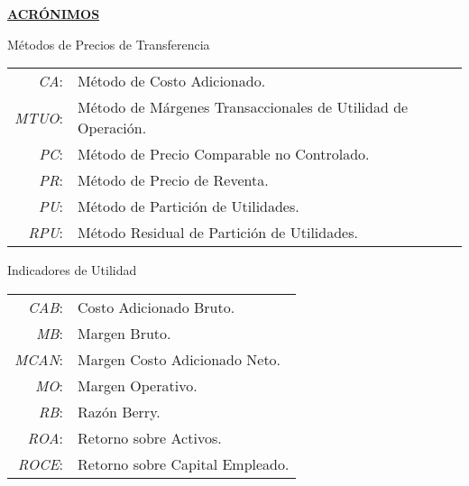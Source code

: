 \begin{center}
	\underline{\textbf{\textcolor{principal}{ACR\'ONIMOS}}}
\end{center}

\textcolor{principal}{Métodos de Precios de Transferencia}

\begin{table}[H]
 	\begin{tabular}{rp{10cm}}
\textit{CA}:&	Método de Costo Adicionado.\\
\textit{MTUO}:&	Método de Márgenes Transaccionales de Utilidad de Operación.\\
\textit{PC}:&	Método de Precio Comparable no Controlado.\\
\textit{PR}:&	Método de Precio de Reventa.\\
\textit{PU}:&	Método de Partición de Utilidades.\\
\textit{RPU}:&	Método Residual de Partición de Utilidades.\\

\end{tabular}
\end{table}

\textcolor{principal}{Indicadores de Utilidad}

\begin{table}[H]
 	\begin{tabular}{rp{10cm}}
\textit{CAB}:&	Costo Adicionado Bruto.\\
\textit{MB}:&	Margen Bruto.\\
\textit{MCAN}:&	Margen Costo Adicionado Neto.\\
\textit{MO}:&	Margen Operativo.\\
\textit{RB}:&	Razón Berry.\\
\textit{ROA}:&	Retorno sobre Activos.\\
\textit{ROCE}:&	Retorno sobre Capital Empleado.\\

\end{tabular}
\end{table}



